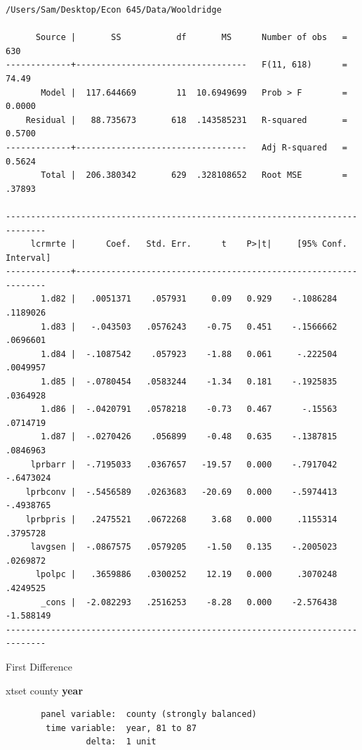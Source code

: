 \documentclass[
]{book}
\newenvironment{Shaded}{\begin{snugshade}}{\end{snugshade}}
\newcommand{\FunctionTok}[1]{\textcolor[rgb]{0.13,0.29,0.53}{\textbf{#1}}}
\newcommand{\NormalTok}[1]{#1}
\begin{document}
\begin{verbatim}
/Users/Sam/Desktop/Econ 645/Data/Wooldridge

      Source |       SS           df       MS      Number of obs   =       630
-------------+----------------------------------   F(11, 618)      =     74.49
       Model |  117.644669        11  10.6949699   Prob > F        =    0.0000
    Residual |   88.735673       618  .143585231   R-squared       =    0.5700
-------------+----------------------------------   Adj R-squared   =    0.5624
       Total |  206.380342       629  .328108652   Root MSE        =    .37893

------------------------------------------------------------------------------
     lcrmrte |      Coef.   Std. Err.      t    P>|t|     [95% Conf. Interval]
-------------+----------------------------------------------------------------
       1.d82 |   .0051371    .057931     0.09   0.929    -.1086284    .1189026
       1.d83 |   -.043503   .0576243    -0.75   0.451    -.1566662    .0696601
       1.d84 |  -.1087542    .057923    -1.88   0.061     -.222504    .0049957
       1.d85 |  -.0780454   .0583244    -1.34   0.181    -.1925835    .0364928
       1.d86 |  -.0420791   .0578218    -0.73   0.467      -.15563    .0714719
       1.d87 |  -.0270426    .056899    -0.48   0.635    -.1387815    .0846963
     lprbarr |  -.7195033   .0367657   -19.57   0.000    -.7917042   -.6473024
    lprbconv |  -.5456589   .0263683   -20.69   0.000    -.5974413   -.4938765
    lprbpris |   .2475521   .0672268     3.68   0.000     .1155314    .3795728
     lavgsen |  -.0867575   .0579205    -1.50   0.135    -.2005023    .0269872
      lpolpc |   .3659886   .0300252    12.19   0.000     .3070248    .4249525
       _cons |  -2.082293   .2516253    -8.28   0.000    -2.576438   -1.588149
------------------------------------------------------------------------------
\end{verbatim}

First Difference

\begin{Shaded}
\begin{Highlighting}[]
\NormalTok{xtset county }\FunctionTok{year}
\end{Highlighting}
\end{Shaded}

\begin{verbatim}
       panel variable:  county (strongly balanced)
        time variable:  year, 81 to 87
                delta:  1 unit
\end{verbatim}
\end{document}
